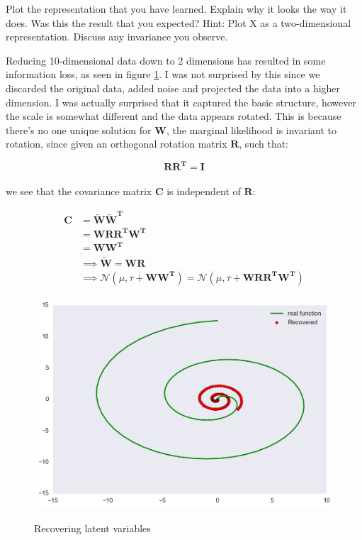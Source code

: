 \documentclass[12pt]{article}
\newenvironment{question}[2][Question]{\begin{trivlist}
\kern10pt
\item[\hskip \labelsep {\bfseries #1}\hskip \labelsep {\bfseries #2.}]}{\end{trivlist}}
\newcommand*{\answer}{%
  \par
  \kern1pt
  \begingroup
    \centering
    \raisebox{.2\baselineskip}{%
      \textcolor{gray}{
	    \rule{.6667\linewidth}{.1pt}%
      }
    }%
    \par
  \kern8pt
  \endgroup
}
\begin{document}
\begin{question}{20}
Plot the representation that you have learned. Explain why it looks the way it does. Was this the result that you expected? Hint: Plot X as a two-dimensional representation.
Discuss any invariance you observe.

\answer

Reducing 10-dimensional data down to 2 dimensions has resulted in some information loss, as seen in figure \ref{pca}. I was not surprised by this since we discarded the original data, added noise and projected the data into a higher dimension. I was actually surprised that it captured the basic structure, however the scale is somewhat different and the data appears rotated. This is because there's no one unique solution for $\boldsymbol{W}$, the marginal likelihood is invariant to rotation, since given an orthogonal rotation matrix $\boldsymbol{R}$, such that:

$$\boldsymbol{RR^T = I}$$
\\
we see that the covariance matrix $\boldsymbol{C}$ is independent of $\boldsymbol{R}$:

\begin{equation}
\begin{split}
\boldsymbol{C} &= \boldsymbol{\tilde W\tilde W^T}
\\
&= \boldsymbol{WRR^TW^T}
\\
&= \boldsymbol{WW^T}\\
&\implies
\boldsymbol{\tilde W = WR}\\
&\implies
\mathcal{N} (\mu, \tau + \boldsymbol{WW^T}) = \mathcal{N} (\mu, \tau + \boldsymbol{WRR^TW^T})
\end{split}
\end{equation}

\begin{figure}
\caption{Recovering latent variables}
\includegraphics[scale=0.8]{pca}
\centering
\label{pca}
\end{figure}

\end{question}
\end{document}
